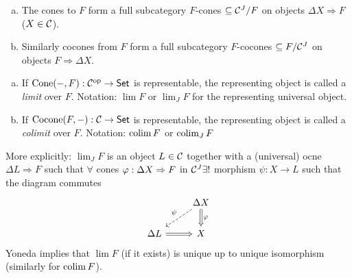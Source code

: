 \documentclass[a4paper]{report}
\begin{document}
\begin{rem}
\begin{enumerate}[(a)]
  \item The cones to $F$ form a full subcategory $F$-cones $\subseteq \mathcal{C}^{J}/F$ on objects $\Delta X \Rightarrow F$ ($X \in \mathcal{C}$).
        \item Similarly cocones from $F$ form a full subcategory $F$-cocones $\subseteq F/{\mathcal{C}^{J}}$ on objects $F \Rightarrow \Delta X$.
\end{enumerate}
\end{rem}

\begin{defi}
\begin{enumerate}[(a)]
  \item If $\operatorname{Cone}(-,F): \mathcal{C}^\mathrm{op} \to \mathsf{Set}$ is representable, the representing object is called a \emph{limit} over $F$. Notation: $\lim F$ or $\lim_{J} F$ for the representing universal object.
  \item If $\operatorname{Cocone}(F, -): \mathcal{C} \to \mathsf{Set}$ is representable, the representing object is called a \emph{colimit} over $F$. Notation: $\operatorname*{colim} F$ or $\operatorname*{colim}_{J} F$
\end{enumerate}

More explicitly: $\lim_{J} F$ is an object $L \in \mathcal{C}$ together with a (universal) ocne $\Delta L \Rightarrow F$ such that $\forall$ cones $\varphi: \Delta X \Rightarrow F$ in $\mathcal{C}^{J} \exists!$ morphism $\psi: X \to L$ such that the diagram commutes \[\begin{tikzcd}
                               & \Delta X \arrow[d, "\varphi", Rightarrow] \arrow[ld, "\psi"', dashed] \\
\Delta L \arrow[r, Rightarrow] & X
\end{tikzcd}\]
Yoneda implies that $\lim F$ (if it exists) is unique up to unique isomorphism (similarly for $\operatorname*{colim} F$).
\end{defi}
\end{document}
